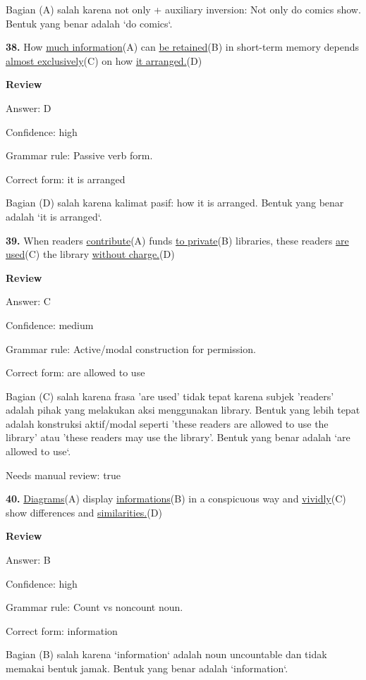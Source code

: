 \documentclass[12pt]{article}
\begin{document}
Bagian (A) salah karena not only + auxiliary inversion: Not only do comics show. Bentuk yang benar adalah `do comics`.\par
\endgroup
\par
\vspace{\questionblockgap}
\noindent\textbf{38.} How \uline{much information}(A) can \uline{be retained}(B) in short-term memory depends \uline{almost exclusively}(C) on how \uline{it arranged.}(D)
\par
\begingroup
\setlength{\parskip}{0pt}
\setlength{\parindent}{0pt}
\textbf{Review}\par
Answer: D\par
Confidence: high\par
Grammar rule: Passive verb form.\par
Correct form: it is arranged\par
Bagian (D) salah karena kalimat pasif: how it is arranged. Bentuk yang benar adalah `it is arranged`.\par
\endgroup
\par
\vspace{\questionblockgap}
\noindent\textbf{39.} When readers \uline{contribute}(A) funds \uline{to private}(B) libraries, these readers \uline{are used}(C) the library \uline{without charge.}(D)
\par
\begingroup
\setlength{\parskip}{0pt}
\setlength{\parindent}{0pt}
\textbf{Review}\par
Answer: C\par
Confidence: medium\par
Grammar rule: Active/modal construction for permission.\par
Correct form: are allowed to use\par
Bagian (C) salah karena frasa 'are used' tidak tepat karena subjek 'readers' adalah pihak yang melakukan aksi menggunakan library. Bentuk yang lebih tepat adalah konstruksi aktif/modal seperti 'these readers are allowed to use the library' atau 'these readers may use the library'. Bentuk yang benar adalah `are allowed to use`.\par
Needs manual review: true\par
\endgroup
\par
\vspace{\questionblockgap}
\noindent\textbf{40.} \uline{Diagrams}(A) display \uline{informations}(B) in a conspicuous way and \uline{vividly}(C) show differences and \uline{similarities.}(D)
\par
\begingroup
\setlength{\parskip}{0pt}
\setlength{\parindent}{0pt}
\textbf{Review}\par
Answer: B\par
Confidence: high\par
Grammar rule: Count vs noncount noun.\par
Correct form: information\par
Bagian (B) salah karena `information` adalah noun uncountable dan tidak memakai bentuk jamak. Bentuk yang benar adalah `information`.\par
\endgroup
\par
\vspace{\questionblockgap}
\end{document}
